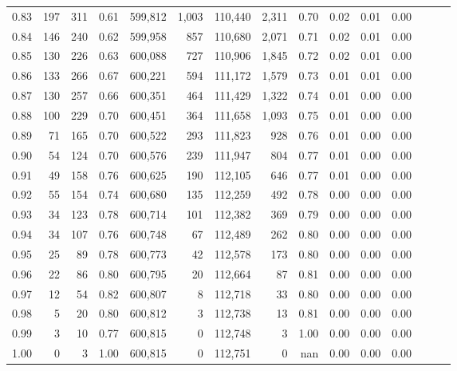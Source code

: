 \begin{tabular}{rrrrrrrrrrrrrrr}
0.83 &     197 &    311 &  0.61 &  599,812 &    1,003 &  110,440 &    2,311 &  0.70 &  0.02 &  0.01 &      0.00 \\
0.84 &     146 &    240 &  0.62 &  599,958 &      857 &  110,680 &    2,071 &  0.71 &  0.02 &  0.01 &      0.00 \\
0.85 &     130 &    226 &  0.63 &  600,088 &      727 &  110,906 &    1,845 &  0.72 &  0.02 &  0.01 &      0.00 \\
0.86 &     133 &    266 &  0.67 &  600,221 &      594 &  111,172 &    1,579 &  0.73 &  0.01 &  0.01 &      0.00 \\
0.87 &     130 &    257 &  0.66 &  600,351 &      464 &  111,429 &    1,322 &  0.74 &  0.01 &  0.00 &      0.00 \\
0.88 &     100 &    229 &  0.70 &  600,451 &      364 &  111,658 &    1,093 &  0.75 &  0.01 &  0.00 &      0.00 \\
0.89 &      71 &    165 &  0.70 &  600,522 &      293 &  111,823 &      928 &  0.76 &  0.01 &  0.00 &      0.00 \\
0.90 &      54 &    124 &  0.70 &  600,576 &      239 &  111,947 &      804 &  0.77 &  0.01 &  0.00 &      0.00 \\
0.91 &      49 &    158 &  0.76 &  600,625 &      190 &  112,105 &      646 &  0.77 &  0.01 &  0.00 &      0.00 \\
0.92 &      55 &    154 &  0.74 &  600,680 &      135 &  112,259 &      492 &  0.78 &  0.00 &  0.00 &      0.00 \\
0.93 &      34 &    123 &  0.78 &  600,714 &      101 &  112,382 &      369 &  0.79 &  0.00 &  0.00 &      0.00 \\
0.94 &      34 &    107 &  0.76 &  600,748 &       67 &  112,489 &      262 &  0.80 &  0.00 &  0.00 &      0.00 \\
0.95 &      25 &     89 &  0.78 &  600,773 &       42 &  112,578 &      173 &  0.80 &  0.00 &  0.00 &      0.00 \\
0.96 &      22 &     86 &  0.80 &  600,795 &       20 &  112,664 &       87 &  0.81 &  0.00 &  0.00 &      0.00 \\
0.97 &      12 &     54 &  0.82 &  600,807 &        8 &  112,718 &       33 &  0.80 &  0.00 &  0.00 &      0.00 \\
0.98 &       5 &     20 &  0.80 &  600,812 &        3 &  112,738 &       13 &  0.81 &  0.00 &  0.00 &      0.00 \\
0.99 &       3 &     10 &  0.77 &  600,815 &        0 &  112,748 &        3 &  1.00 &  0.00 &  0.00 &      0.00 \\
1.00 &       0 &      3 &  1.00 &  600,815 &        0 &  112,751 &        0 &   nan &  0.00 &  0.00 &      0.00 \\
\bottomrule
\end{tabular}
